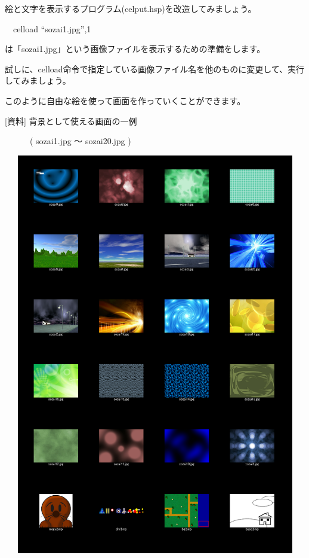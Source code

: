 \documentclass[a4paper,dvipdfmx]{jarticle}
\begin{document}
\bigskip

絵と文字を表示するプログラム(celput.hsp)を改造してみましょう。


\bigskip

\ \ celload “sozai1.jpg”,1


\bigskip

は「sozai1.jpg」という画像ファイルを表示するための準備をします。

試しに、celload命令で指定している画像ファイル名を他のものに変更して、実行してみましょう。

このように自由な絵を使って画面を作っていくことができます。


\bigskip

[資料] 背景として使える画面の一例

　　　( sozai1.jpg 〜 sozai20.jpg )


\bigskip



\begin{center}
\includegraphics[width=14.843cm,height=17.609cm]{text04-img/text04-img014.png}

\end{center}
\end{document}
